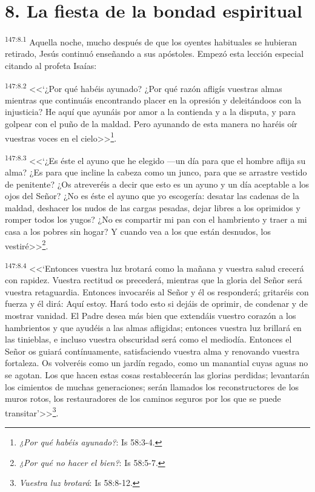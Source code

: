 \section*{8. La fiesta de la bondad espiritual}
\par 
\textsuperscript{147:8.1} Aquella noche, mucho después de que los oyentes habituales se hubieran retirado, Jesús continuó enseñando a sus apóstoles. Empezó esta lección especial citando al profeta Isaías:

\par 
\textsuperscript{147:8.2} <<`¿Por qué habéis ayunado? ¿Por qué razón afligís vuestras almas mientras que continuáis encontrando placer en la opresión y deleitándoos con la injusticia? He aquí que ayunáis por amor a la contienda y a la disputa, y para golpear con el puño de la maldad. Pero ayunando de esta manera no haréis oír vuestras voces en el cielo>>\footnote{\textit{¿Por qué habéis ayunado?}: Is 58:3-4.}.

\par 
\textsuperscript{147:8.3} <<`¿Es éste el ayuno que he elegido ---un día para que el hombre aflija su alma? ¿Es para que incline la cabeza como un junco, para que se arrastre vestido de penitente? ¿Os atreveréis a decir que esto es un ayuno y un día aceptable a los ojos del Señor? ¿No es éste el ayuno que yo escogería: desatar las cadenas de la maldad, deshacer los nudos de las cargas pesadas, dejar libres a los oprimidos y romper todos los yugos? ¿No es compartir mi pan con el hambriento y traer a mi casa a los pobres sin hogar? Y cuando vea a los que están desnudos, los vestiré>>\footnote{\textit{¿Por qué no hacer el bien?}: Is 58:5-7.}.

\par 
\textsuperscript{147:8.4} <<`Entonces vuestra luz brotará como la mañana y vuestra salud crecerá con rapidez. Vuestra rectitud os precederá, mientras que la gloria del Señor será vuestra retaguardia. Entonces invocaréis al Señor y él os responderá; gritaréis con fuerza y él dirá: Aquí estoy. Hará todo esto si dejáis de oprimir, de condenar y de mostrar vanidad. El Padre desea más bien que extendáis vuestro corazón a los hambrientos y que ayudéis a las almas afligidas; entonces vuestra luz brillará en las tinieblas, e incluso vuestra obscuridad será como el mediodía. Entonces el Señor os guiará contínuamente, satisfaciendo vuestra alma y renovando vuestra fortaleza. Os volveréis como un jardín regado, como un manantial cuyas aguas no se agotan. Los que hacen estas cosas restablecerán las glorias perdidas; levantarán los cimientos de muchas generaciones; serán llamados los reconstructores de los muros rotos, los restauradores de los caminos seguros por los que se puede transitar'>>\footnote{\textit{Vuestra luz brotará}: Is 58:8-12.}.

